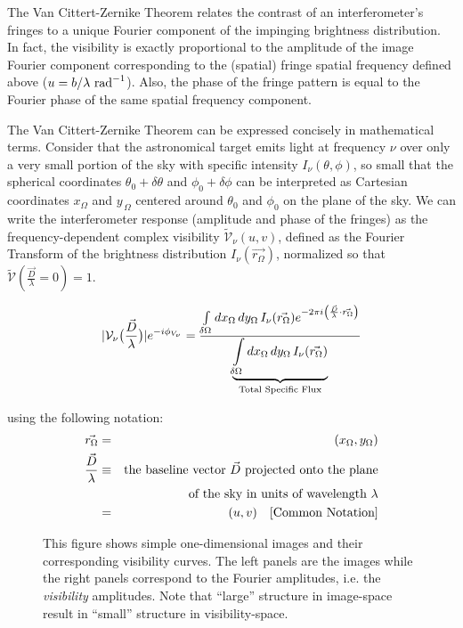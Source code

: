 \documentclass[12pt]{iopart}
\def\text{\rm}
\begin{document}
The Van Cittert-Zernike Theorem \citep[see][for complete discussion
and proof]{tms2001} relates the contrast of an interferometer's
fringes to a unique Fourier component of the impinging brightness
distribution.  In fact, the visibility is exactly proportional to the
amplitude of the image Fourier component corresponding to
the (spatial) fringe spatial frequency defined above ($u=b/\lambda
\text{ ~rad}^{-1}$).  Also, the phase of the fringe pattern is equal
to the Fourier phase of the same spatial frequency component.

The Van Cittert-Zernike Theorem can be expressed concisely in
mathematical terms. Consider that the astronomical target emits light
at frequency $\nu$ over only a very small portion of the sky with
specific intensity $I_\nu(\theta,\phi)$, so small that the spherical
coordinates $\theta_0+\delta\theta$ and $\phi_0+\delta\phi$ can be
interpreted as Cartesian coordinates $x_\Omega$ and $y_{\,\Omega}$
centered around $\theta_0$ and $\phi_0$ on the plane of the sky.  We
can write the interferometer response (amplitude and phase of the
fringes) as the frequency-dependent complex visibility
$\tilde{\mathcal V}_\nu(u,v)$, defined as the Fourier Transform of the
brightness distribution $I_\nu(\vec{r_{\Omega}})$, normalized so that
$\tilde{\mathcal V}(\frac{\vec{D}}{\lambda}=0) =1$.


\begin{equation}
|{\mathcal V}_\nu\big(\frac{\vec{D}}{\lambda}\big)|e^{-i\phi_{V_\nu}}
        =\frac{
         \int\limits_{\delta\Omega} dx_{\Omega}\,dy_{\Omega}\,
        I_\nu(\vec{r_\Omega})
           e^{-2\pi i\left(\frac{\vec{D}}{\lambda}\cdot\vec{r_\Omega}\right)}}{
        \underbrace{\int\limits_{\delta\Omega}dx_\Omega\,dy_{\Omega}\,
         I_\nu(\vec{r_\Omega})}_{\mbox{\scriptsize Total Specific Flux}}}
\end{equation}

using the following notation:
\begin{eqnarray}
 \vec{r_\Omega}&=&(x_\Omega,y_\Omega)\nonumber\\
 \frac{\vec{D}}{\lambda}&\equiv&
        \mbox{the baseline vector $\vec{D}$ projected onto the plane}\nonumber\\
        &&\mbox{of the sky in units of wavelength $\lambda$}\nonumber\\
        &=&(u,v) ~~~{\rm [Common~Notation]} \label{eq_uv}
\end{eqnarray}

\begin{figure}
\begin{center}

\centerline{}
\caption[Example 1-D images and visibility curves]{This figure shows 
simple one-dimensional images and their corresponding visibility curves.
The left panels are the images while the right panels correspond to the
Fourier amplitudes, i.e. the {\em visibility} amplitudes.  
Note that ``large'' structure in image-space result in
``small'' structure in visibility-space.}
\label{fig:visibility}
\end{center}
\end{figure}
\end{document}
